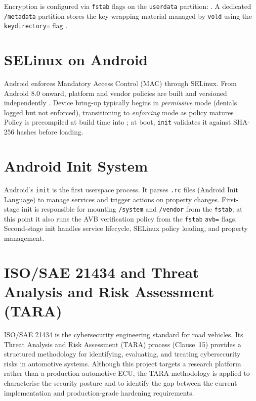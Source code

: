 Encryption is configured via \texttt{fstab} flags on the \texttt{userdata} partition: . A dedicated \texttt{/metadata} partition stores the key wrapping material managed by \texttt{vold} using the \texttt{keydirectory=} flag \cite{android_fbe, android_data_encryption}.

\section{SELinux on Android}
\label{sec:bg_selinux}

Android enforces Mandatory Access Control (MAC) through SELinux. From Android 8.0 onward, platform and vendor policies are built and versioned independently \cite{selinux_build_precompiled}. Device bring-up typically begins in \textit{permissive} mode (denials logged but not enforced), transitioning to \textit{enforcing} mode as policy matures \cite{selinux_device_policy}. Policy is precompiled at build time into ; at boot, \texttt{init} validates it against SHA-256 hashes before loading.

\section{Android Init System}
\label{sec:bg_init}

Android's \texttt{init} is the first userspace process. It parses \texttt{.rc} files (Android Init Language) to manage services and trigger actions on property changes. First-stage init is responsible for mounting \texttt{/system} and \texttt{/vendor} from the \texttt{fstab}; at this point it also runs the AVB verification policy from the \texttt{fstab} \texttt{avb=} flags. Second-stage init handles service lifecycle, SELinux policy loading, and property management.

\section{ISO/SAE 21434 and Threat Analysis and Risk Assessment (TARA)}
\label{sec:bg_tara}

ISO/SAE 21434 \cite{iso_sae_21434} is the cybersecurity engineering standard for road vehicles. Its Threat Analysis and Risk Assessment (TARA) process (Clause~15) provides a structured methodology for identifying, evaluating, and treating cybersecurity risks in automotive systems. Although this project targets a research platform rather than a production automotive ECU, the TARA methodology is applied to characterise the security posture and to identify the gap between the current implementation and production-grade hardening requirements.

